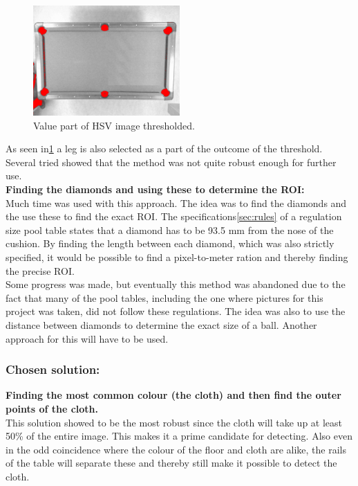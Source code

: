 \begin{figure}[H]
\begin{center}
\leavevmode
\includegraphics[width=0.5\textwidth]{images/value_thres}
\end{center}
\caption{Value part of HSV image thresholded.}
\label{fig:value_thres}
\end{figure}

As seen in\ref{fig:value_thres} a leg is also selected as a part of the outcome of the threshold. Several tried showed that the method was not quite robust enough for further use.\\

\textbf{Finding the diamonds and using these to determine the ROI:}\\
Much time was used with this approach. The idea was to find the diamonds and the use these to find the exact ROI. The specifications\ref{sec:rules} of a regulation size pool table states that a diamond has to be 93.5 mm from the nose of the cushion. By finding the length between each diamond, which was also strictly specified, it would be possible to find a pixel-to-meter ration and thereby finding the precise ROI.\\

Some progress was made, but eventually this method was abandoned due to the fact that many of the pool tables, including the one where pictures for this  project was taken, did not follow these regulations. The idea was also to use the distance between diamonds to determine the exact size of a ball. Another approach for this will have to be used.\\

\subsubsection{Chosen solution:}

\textbf{Finding the most common colour (the cloth) and then find the outer points of the cloth.}\\
This solution showed to be the most robust since the cloth will take up at least 50\% of the entire image. This makes it a prime candidate for detecting. Also even in the odd coincidence where the colour of the floor and cloth are alike, the rails of the table will separate these and thereby still make it possible to detect the cloth.\\

